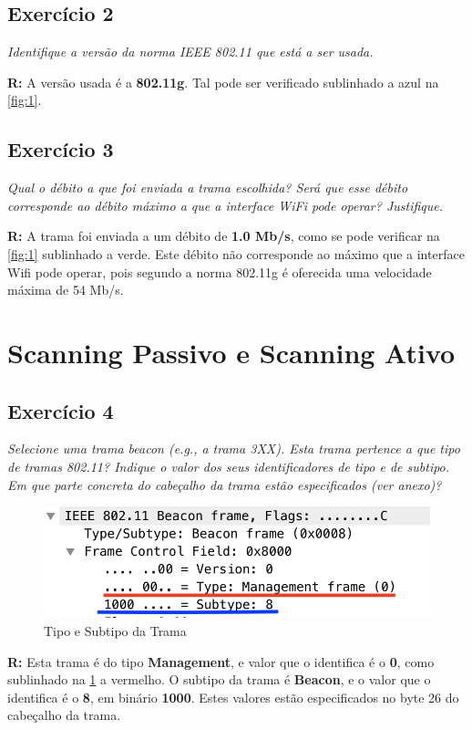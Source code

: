 \documentclass{llncs}
\begin{document}
\subsection{Exercício 2}
\emph{Identifique a versão da norma IEEE 802.11 que está a ser usada.}
\\ \par
\textbf{R:} A versão usada é a \textbf{802.11g}. Tal pode ser verificado sublinhado a azul na \ref{fig:1}.


\subsection{Exercício 3}
\emph{Qual o débito a que foi enviada a trama escolhida? Será que esse débito corresponde ao débito máximo a que a interface WiFi pode operar? Justifique.}
\\ \par
\textbf{R:} A trama foi enviada a um débito de \textbf{1.0 Mb/s}, como se pode verificar na \ref{fig:1} sublinhado a verde. Este débito não corresponde ao máximo que a interface Wifi pode operar, pois segundo a norma 802.11g é oferecida uma velocidade máxima de 54 Mb/s.


\section{Scanning Passivo e Scanning Ativo}

\subsection{Exercício 4}
\emph{Selecione uma trama beacon (e.g., a trama 3XX). Esta trama pertence a que tipo de tramas 802.11? Indique o valor dos seus identificadores de tipo e de subtipo. Em que parte concreta do cabeçalho da trama estão especificados (ver anexo)?}

\begin{figure}[H]
\begin{center}
\includegraphics[scale=0.45]{4.png} 
\end{center}
\caption{\label{fig:4}Tipo e Subtipo da Trama}
\end{figure} 
\par
\textbf{R:} Esta trama é do tipo \textbf{Management}, e valor que o identifica é o \textbf{0}, como sublinhado na \ref{fig:4} a vermelho. O subtipo da trama é \textbf{Beacon}, e o valor que o identifica é o \textbf{8}, em binário \textbf{1000}. Estes valores estão especificados no byte 26 do cabeçalho da trama.
\end{document}
